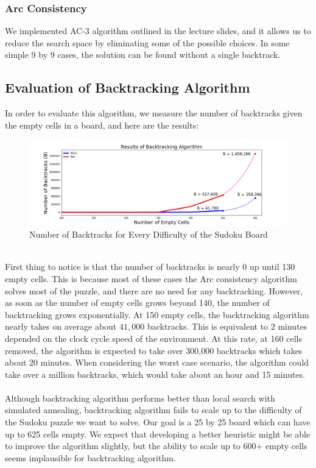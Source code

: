 \documentclass[12pt, a4paper]{article}
\begin{document}
			\subsubsection{Arc Consistency}
				We implemented AC-3 algorithm outlined in the lecture slides, and it allows us to reduce the search space by eliminating some of the possible choices. In some simple 9 by 9 cases, the solution can be found without a single backtrack.
		\subsection{Evaluation of Backtracking Algorithm}
			In order to evaluate this algorithm, we measure the number of backtracks given the empty cells in a board, and here are the results:
			\begin{figure}[h]
				\begin{center} 
					\includegraphics[width=7in]{backtrack.png}
					\caption{Number of Backtracks for Every Difficulty of the Sudoku Board} 
				\end{center} 
			\end{figure}\\
			First thing to notice is that the number of backtracks is nearly 0 up until 130 empty cells. This is because most of these cases the Arc consistency algorithm solves most of the puzzle, and there are no need for any backtracking. However, as soon as the number of empty cells grows beyond 140, the number of backtracking grows exponentially. At 150 empty cells, the backtracking algorithm nearly takes on average about $41,000$ backtracks. This is equivalent to 2 minutes depended on the clock cycle speed of the environment. At this rate, at 160 cells removed, the algorithm is expected to take over 300,000 backtracks which takes about 20 minutes. When considering the worst case scenario, the algorithm could take over a million backtracks, which would take about an hour and 15 minutes.\\\\
			Although backtracking algorithm performs better than local search with simulated annealing, backtracking algorithm fails to scale up to the difficulty of the Sudoku puzzle we want to solve. Our goal is a 25 by 25 board which can have up to 625 cells empty. We expect that developing a better heuristic might be able to improve the algorithm slightly, but the ability to scale up to 600+ empty cells seems implausible for backtracking algorithm.
\end{document}
